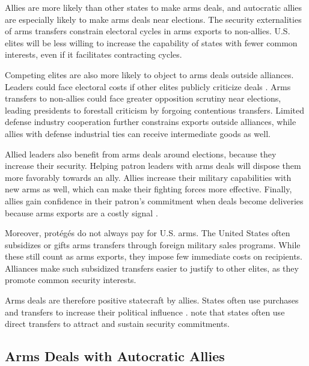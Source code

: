 \documentclass[12pt]{article}
\begin{document}
Allies are more likely than other states to make arms deals, and autocratic allies are especially likely to make arms deals near elections. 
The security externalities of arms transfers constrain electoral cycles in arms exports to non-allies. 
U.S. elites will be less willing to increase the capability of states with fewer common interests, even if it facilitates contracting cycles.


Competing elites are also more likely to object to arms deals outside alliances.
Leaders could face electoral costs if other elites publicly criticize deals \citep{Saunders2022}.
Arms transfers to non-allies could face greater opposition scrutiny near elections, leading presidents to forestall criticism by forgoing contentious transfers.
Limited defense industry cooperation further constrains exports outside alliances, while allies with defense industrial ties can receive intermediate goods as well.


Allied leaders also benefit from arms deals around elections, because they increase their security.
Helping patron leaders with arms deals will dispose them more favorably towards an ally. 
Allies increase their military capabilities with new arms as well, which can make their fighting forces more effective. 
Finally, allies gain confidence in their patron's commitment when deals become deliveries because arms exports are a costly signal \citep{McManusYarhi-Milo2017}.


Moreover, prot{\'e}g{\'e}s do not always pay for U.S. arms.
The United States often subsidizes or gifts arms transfers through foreign military sales programs. 
While these still count as arms exports, they impose few immediate costs on recipients.
Alliances make such subsidized transfers easier to justify to other elites, as they promote common security interests. 


Arms deals are therefore positive statecraft by allies. 
States often use purchases and transfers to increase their political influence \citep[pg. 42-3]{Baldwin2020}.
\citet[pg. 184-5]{IkenberryGrieco2003} note that states often use direct transfers to attract and sustain security commitments.  



\subsection{Arms Deals with Autocratic Allies}
\end{document}
